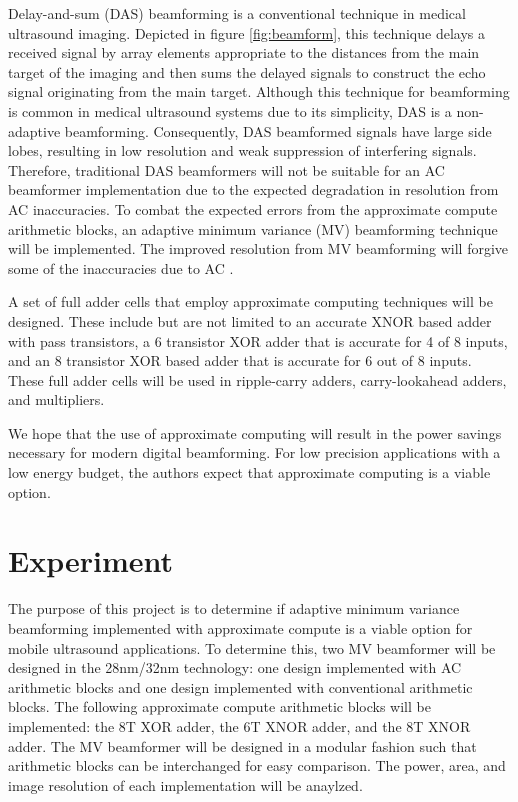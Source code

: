 \documentclass[journal]{IEEEtran}
\begin{document}
Delay-and-sum (DAS) beamforming is a conventional technique in medical ultrasound imaging. Depicted in figure \ref{fig:beamform}, this technique delays a received signal by array elements appropriate to the distances from the main target of the imaging and then sums the delayed signals to construct the echo signal originating from the main target. Although this technique for beamforming is common in medical ultrasound systems due to its simplicity, DAS is a non-adaptive beamforming. Consequently, DAS beamformed signals have large side lobes, resulting in low resolution and weak suppression of interfering signals. Therefore, traditional DAS beamformers will not be suitable for an AC beamformer implementation due to the expected degradation in resolution from AC inaccuracies. To combat the expected errors from the approximate compute arithmetic blocks, an adaptive minimum variance (MV) beamforming technique will be implemented. The improved resolution from MV beamforming will forgive some of the inaccuracies due to AC \cite{synnevag2007adaptive}.  

A set of full adder cells that employ approximate computing techniques will be designed. These include but are not limited to an accurate XNOR based adder with pass transistors, a 6 transistor XOR adder that is accurate for 4 of 8 inputs, and an 8 transistor XOR based adder that is accurate for 6 out of 8 inputs. These full adder cells will be used in ripple-carry adders, carry-lookahead adders, and multipliers.

We hope that the use of approximate computing will result in the power savings necessary for modern digital beamforming. For low precision applications with a low energy budget, the authors expect that approximate computing is a viable option.

\section{Experiment}

The purpose of this project is to determine if adaptive minimum variance beamforming implemented with approximate compute is a viable option for mobile ultrasound applications. To determine this, two MV beamformer will be designed in the 28nm/32nm technology: one design implemented with AC arithmetic blocks and one design implemented with conventional arithmetic blocks. The following approximate compute arithmetic blocks will be implemented: the 8T XOR adder, the 6T XNOR adder, and the 8T XNOR adder. The MV beamformer will be designed in a modular fashion such that arithmetic blocks can be interchanged for easy comparison. The power, area, and image resolution of each implementation will be anaylzed.
\end{document}

